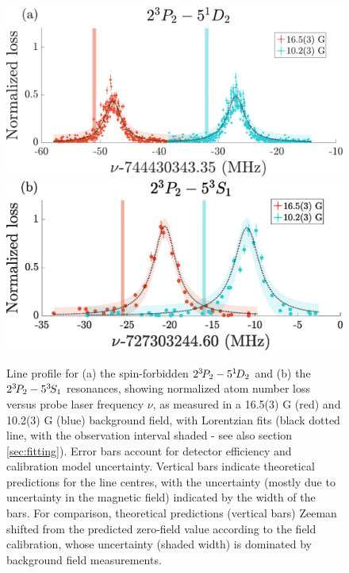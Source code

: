 \begin{figure}
      \includegraphics[width=\textwidth]{fig/spectroscopy/ci-plot-51D2.pdf}
    \includegraphics[width=\textwidth]{fig/spectroscopy/ci-plot-53S1}
   \caption{Line profile for (a) the spin-forbidden $2^{3\!}P_2 -  5^{1\!}D_2$  and (b) the $2^{3\!} P_2 - 5^{3\!} S_1$  resonances, showing normalized atom number loss versus probe laser frequency $\nu$, as measured in a {16.5(3)} G (red) and {10.2(3)} G (blue) background field, with Lorentzian fits (black dotted line, with the observation interval shaded - see also section \ref{sec:fitting}).
	Error bars account for detector efficiency and calibration model uncertainty. 
	Vertical bars indicate theoretical predictions for the line centres, with the uncertainty (mostly due to uncertainty in the magnetic field) indicated by the width of the bars.
	For comparison, theoretical predictions (vertical bars) Zeeman shifted from the predicted zero-field value \cite{Drake07} according to the field calibration, whose uncertainty (shaded width) is dominated by background field measurements.}
    \label{fig:simple_lines}

\end{figure}


